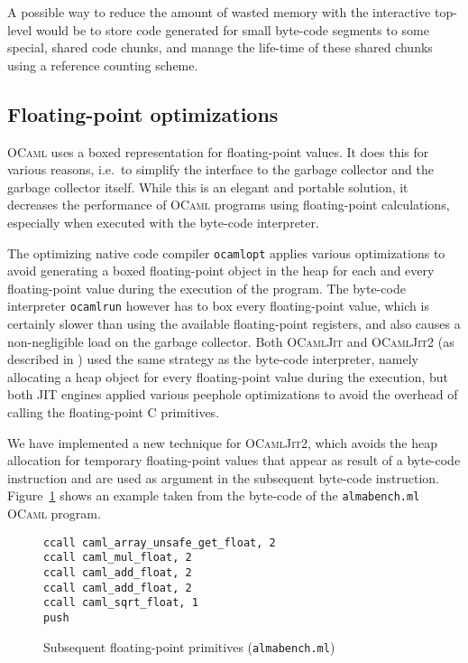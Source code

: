 \documentclass[12pt,a4paper,final]{article}
\begin{document}
A possible way to reduce the amount of wasted memory with the interactive
top-level would be to store code generated for small byte-code segments to some special,
shared code chunks, and manage the life-time of these shared chunks using a
reference counting scheme.

\subsection{Floating-point optimizations} \label{subsection:Floating_point_optimizations}

\textsc{OCaml} uses a boxed representation for floating-point values. It does this
for various reasons, i.e.~to simplify the interface to the garbage collector
and the garbage collector itself. While this is an elegant and portable solution, it decreases
the performance of \textsc{OCaml} programs using floating-point calculations, especially
when executed with the byte-code interpreter.

The optimizing native code compiler \texttt{ocamlopt} applies various optimizations to avoid generating
a boxed floating-point object in the heap for each and every floating-point value during
the execution of the program. The byte-code interpreter \texttt{ocamlrun} however has to box every floating-point
value, which is certainly slower than using the available floating-point registers, and
also causes a non-negligible load on the garbage collector. Both \textsc{OCamlJit} and
\textsc{OCamlJit2} (as described in \cite{Meurer10:OCamlJit2.0}) used the same strategy
as the byte-code interpreter, namely allocating a heap object for every floating-point
value during the execution, but both JIT engines applied various peephole optimizations
to avoid the overhead of calling the floating-point C primitives.

We have implemented a new technique for \textsc{OCamlJit2}, which avoids the heap
allocation for temporary floating-point values that appear as result of a byte-code
instruction and are used as argument in the subsequent byte-code instruction.
Figure~\ref{figure:Subsequent_floating_point_primitives_almabench} shows an example
taken from the byte-code of the \texttt{almabench.ml} \textsc{OCaml} program.

\begin{figure}[h]
  \centering
  \begin{varwidth}{\linewidth}
\begin{verbatim}
ccall caml_array_unsafe_get_float, 2
ccall caml_mul_float, 2
ccall caml_add_float, 2
ccall caml_add_float, 2
ccall caml_sqrt_float, 1
push
\end{verbatim}
  \end{varwidth}
  \caption{Subsequent floating-point primitives (\texttt{almabench.ml})}
  \label{figure:Subsequent_floating_point_primitives_almabench}
\end{figure}
\end{document}
